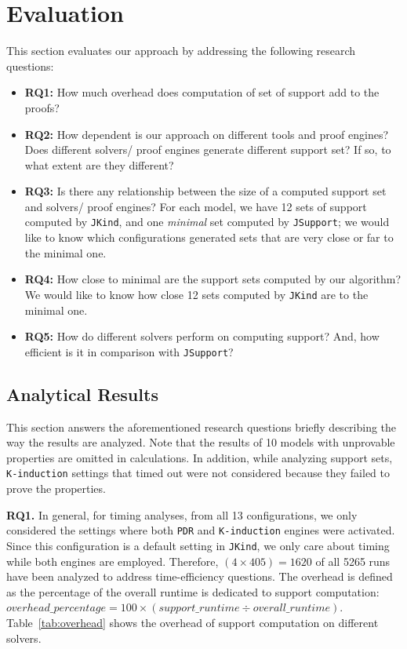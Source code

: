 \section{Evaluation}
\label{sec:eval}
This section evaluates our approach by addressing the following research questions:

\begin{itemize}
    \item \textbf{RQ1:} How much overhead does computation of set of support add to the proofs? 
    \item \textbf{RQ2:} How dependent is our approach on different tools and proof engines? Does different solvers/ proof engines generate different support set? If so, to what extent are they different?
    \item \textbf{RQ3:} Is there any relationship between the size of a computed support set and 
    solvers/ proof engines? For each model, we have 12 sets of support computed by \texttt{JKind}, and one \emph{minimal} set computed by \texttt{JSupport}; we would like to know which configurations generated sets that are very close or far to the minimal one.
    \item \textbf{RQ4:} How close to minimal are the support sets computed by our algorithm? We would like to know how close 12 sets computed by \texttt{JKind} are to the minimal one.
    \item \textbf{RQ5:} How do different solvers perform on computing support? And, how efficient is it in comparison with \texttt{JSupport}?
\end{itemize} 

\subsection{Analytical Results}
\label{sec:res}
This section answers the aforementioned research questions briefly describing the way the results are analyzed. Note that the results of 10 models with unprovable properties are omitted in calculations. In addition, while analyzing support sets, \texttt{K-induction} settings that timed out were not considered because they failed to prove the properties.

\textbf{RQ1.} In general, for timing analyses, from all 13 configurations, we only considered the settings where both \texttt{PDR} and \texttt{K-induction} engines were activated. Since this configuration is a default setting in \texttt{JKind}, we only care about timing while both engines are employed. Therefore, $(4 \times 405) = 1620$ of all 5265 runs have been analyzed to address time-efficiency questions. The overhead is defined as the percentage of the overall runtime is dedicated to support computation:
\mbox{$overhead\_percentage = 100 \times (support\_runtime \div overall\_runtime)$}.
 Table~\ref{tab:overhead} shows the overhead of support computation on different solvers.

